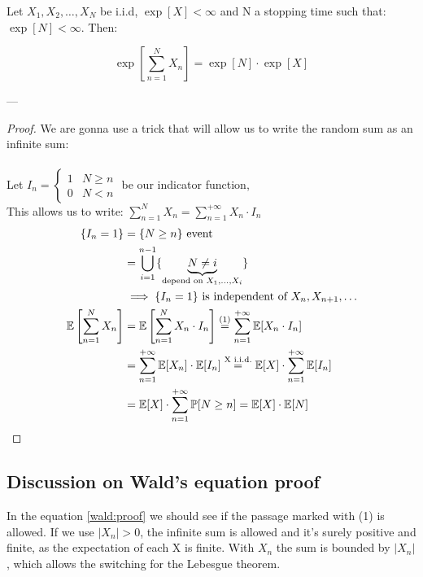 \begin{theorem}
	Let $X_1, X_2, \dots, X_N $ be i.i.d, $\exp[X] < \infty$ and N a stopping time such that: $\exp[N] < \infty$. Then:

	\begin{equation}
		\exp\left[\sum\limits_{n=1}^N X_n \right] = \exp[N] \cdot \exp[X]
	\end{equation}
\end{theorem}
---
\begin{proof}
	We are gonna use a trick that will allow us to write the random sum as an infinite sum:\\ \\
	Let $I_n = \begin{cases} 1 & N \ge n \\ 0 & N<n \end{cases}$ \quad be our indicator function,\\
	This allows us to write: $\sum\limits_{n=1}^N X_n = \sum\limits_{n=1}^{+\infty} X_n \cdot I_n$
	\begin{equation}\begin{split} \label{wald:proof}
		\{I_n=1\} &= \{N \ge n \} \text{ event}\\
		&= \bigcup\limits_{i=1}^{n-1}\{\underbrace{N \neq i}_{\text{depend on } X_1, \dots, X_i} \} \\
		&\implies \{I_n=1\} \text{ is independent of }X_n, X_{n+1}, \dots\\
		\mathbb{E}\left[\sum\limits_{n=1}^{N}X_n\right] &= \mathbb{E}\left[\sum\limits_{n=1}^{N}X_n \cdot I_n \right] \stackrel{(1)}{=} \sum\limits_{n=1}^{+\infty}\mathbb{E}[X_n \cdot I_n] \\
		&=\sum\limits_{n=1}^{+\infty}\mathbb{E}[X_n] \cdot \mathbb{E}[I_n] \stackrel{\text{X i.i.d.}}{=} \mathbb{E}[X]\cdot\sum\limits_{n=1}^{+\infty}\mathbb{E}[I_n] \\
		&= \mathbb{E}[X] \cdot \sum\limits_{n=1}^{+\infty}\mathbb{P}[N \ge n] = \mathbb{E}[X] \cdot \mathbb{E}[N]
	\end{split}\end{equation}
\end{proof}

\subsection{Discussion on Wald's equation proof}
	In the equation \ref{wald:proof} we should see if the passage marked with (1) is allowed.
	If we use $|X_n|>0$, the infinite sum is allowed and it's surely positive and finite, as the expectation of each X is finite.
	With $X_n$ the sum is bounded by $|X_n|$, which allows the switching for the Lebesgue theorem.

